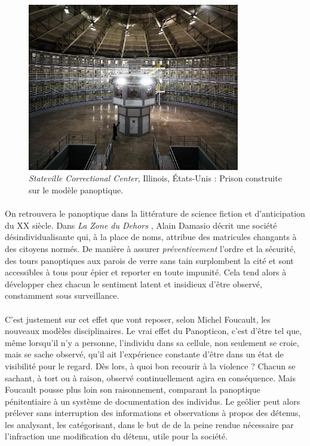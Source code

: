 \begin{figure}[ht]
    \centering
    \includegraphics[width=350px]{chapters/01/images/panoptique.jpg}
    \caption{\label{panoptique}\emph{Stateville Correctional Center}, Illinois, États-Unis : Prison construite sur le modèle panoptique.}
\end{figure}

\paragraph{} On retrouvera le panoptique dans la littérature de science fiction et d'anticipation du XX siècle.
Dans \emph{La Zone du Dehors} \cite{Damasio0}, Alain Damasio décrit une société désindividualisante qui, à la place
de noms, attribue des matricules changants à des citoyens normés. De manière à assurer \emph{préventivement} l'ordre et la
sécurité, des tours panoptiques aux parois de verre sans tain surplombent la cité et sont accessibles à tous pour épier
et reporter en toute impunité. Cela tend alors à développer chez chacun le sentiment latent et insidieux d'être observé, 
constamment sous surveillance.

\paragraph{} C'est justement sur cet effet que vont reposer, selon Michel Foucault, les nouveaux modèles disciplinaires.
\guillemotleft Le vrai effet du Panopticon, c'est d'être tel que, même lorsqu'il n'y a personne, l'individu dans sa
cellule, non seulement se croie, mais se sache observé, qu'il ait l'expérience constante d'être dans un état de visibilité
pour le regard.\guillemotright \cite{Foucault0} Dès lors, à quoi bon recourir à la violence ? Chacun se sachant, à tort
ou à raison, observé continuellement agira en conséquence. Mais Foucault pousse plus loin son raisonnement, comparant la
panoptique pénitentiaire à un système de documentation des individus. Le geôlier peut alors prélever sans interruption
des informations et observations à propos des détenus, les analysant, les catégorisant, dans le but de \guillemotleft 
[Faire] de la peine rendue nécessaire par l'infraction une modification du détenu, utile pour la société.\guillemotright

